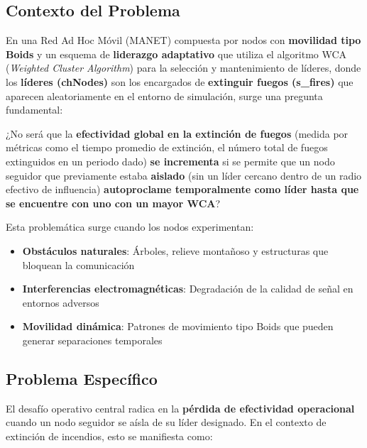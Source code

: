 \documentclass{article}
\begin{document}

\subsection{Contexto del Problema}
En una Red Ad Hoc Móvil (MANET) compuesta por nodos con \textbf{movilidad tipo Boids} y un esquema de \textbf{liderazgo adaptativo} que utiliza el algoritmo WCA (\textit{Weighted Cluster Algorithm}) para la selección y mantenimiento de líderes, donde los \textbf{líderes (chNodes)} son los encargados de \textbf{extinguir fuegos (s\_fires)} que aparecen aleatoriamente en el entorno de simulación, surge una pregunta fundamental:

¿No será que la \textbf{efectividad global en la extinción de fuegos} (medida por métricas como el tiempo promedio de extinción, el número total de fuegos extinguidos en un periodo dado) \textbf{se incrementa} si se permite que un nodo seguidor que previamente estaba \textbf{aislado} (sin un líder cercano dentro de un radio efectivo de influencia) \textbf{autoproclame temporalmente como líder hasta que se encuentre con uno con un mayor WCA}?

Esta problemática surge cuando los nodos experimentan:
\begin{itemize}
    \item \textbf{Obstáculos naturales}: Árboles, relieve montañoso y estructuras que bloquean la comunicación
    \item \textbf{Interferencias electromagnéticas}: Degradación de la calidad de señal en entornos adversos
    \item \textbf{Movilidad dinámica}: Patrones de movimiento tipo Boids que pueden generar separaciones temporales
\end{itemize}

\subsection{Problema Específico}
El desafío operativo central radica en la \textbf{pérdida de efectividad operacional} cuando un nodo seguidor se aísla de su líder designado. En el contexto de extinción de incendios, esto se manifiesta como:
\end{document}
